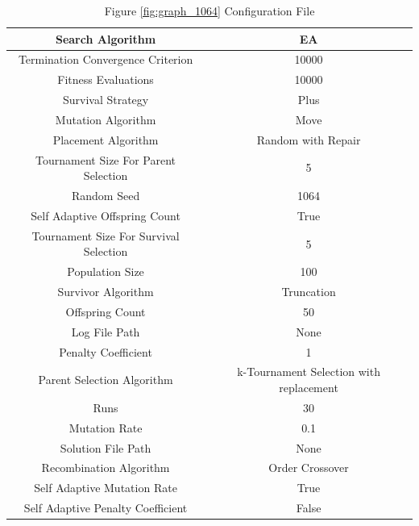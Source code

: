 \documentclass{standalone}
\begin{document}
\begin{table}[!htb]
	\centering
	\caption{Figure \ref{fig:graph_1064} Configuration File}
	\label{tab:graph_1064}
	\begin{tabular}{| c | c |}
		\hline
		Search Algorithm		& EA		 \\
		\hline
		Termination Convergence Criterion		& 10000		 \\
		\hline
		Fitness Evaluations		& 10000		 \\
		\hline
		Survival Strategy		& Plus		 \\
		\hline
		Mutation Algorithm		& Move		 \\
		\hline
		Placement Algorithm		& Random with Repair		 \\
		\hline
		Tournament Size For Parent Selection		& 5		 \\
		\hline
		Random Seed		& 1064		 \\
		\hline
		Self Adaptive Offspring Count		& True		 \\
		\hline
		Tournament Size For Survival Selection		& 5		 \\
		\hline
		Population Size		& 100		 \\
		\hline
		Survivor Algorithm		& Truncation		 \\
		\hline
		Offspring Count		& 50		 \\
		\hline
		Log File Path		& None		 \\
		\hline
		Penalty Coefficient		& 1		 \\
		\hline
		Parent Selection Algorithm		& k-Tournament Selection with replacement		 \\
		\hline
		Runs		& 30		 \\
		\hline
		Mutation Rate		& 0.1		 \\
		\hline
		Solution File Path		& None		 \\
		\hline
		Recombination Algorithm		& Order Crossover		 \\
		\hline
		Self Adaptive Mutation Rate		& True		 \\
		\hline
		Self Adaptive Penalty Coefficient		& False		 \\
		\hline
	\end{tabular}
\end{table}
\end{document}
